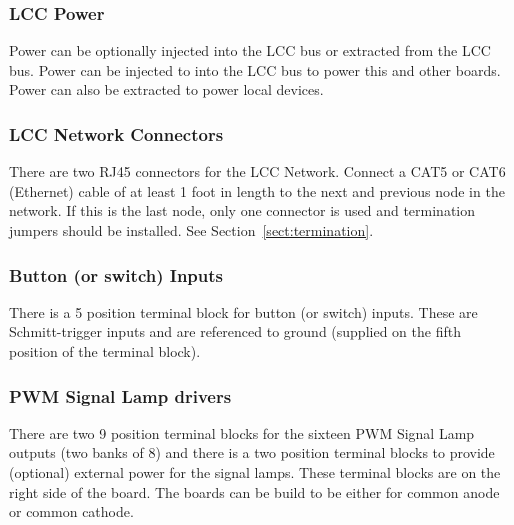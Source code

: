 \documentclass[12pt,twoside]{article}
\begin{document}
\subsubsection{LCC Power}

Power can be optionally injected into the LCC bus or extracted from the LCC 
bus. Power can be injected to into the LCC bus to power this and other boards. 
Power can also be extracted to power local devices.

\subsubsection{LCC Network Connectors}

There are two RJ45 connectors for the LCC Network. Connect a CAT5 or CAT6
(Ethernet) cable of at least 1 foot in length to the next and previous node in
the network. If this is the last node, only one connector is used and
termination jumpers should be installed. See Section~\ref{sect:termination}.

\subsubsection{Button (or switch) Inputs}

There is a 5 position terminal block for button (or switch) inputs.  These are 
Schmitt-trigger inputs and are referenced to ground (supplied on the fifth 
position of the terminal block).

\subsubsection{PWM Signal Lamp drivers}

There are two 9 position terminal blocks for the sixteen PWM Signal Lamp 
outputs (two banks of 8) and there is a two position terminal blocks to 
provide (optional) external power for the signal lamps.  These terminal blocks 
are on the right side of the board.  The boards can be build to be either for 
common anode or common cathode.

\clearpage
\end{document}
